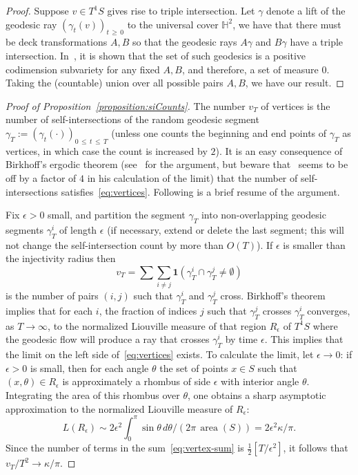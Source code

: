 \documentclass[10pt]{amsart}
\theoremstyle{definition}\newtheorem{defi}[theo]{Definition}\newtheorem{rema}[theo]{Remark}\newtheorem{exam}[theo]{Example}\newtheorem{exem}[theo]{Example}\newtheorem{nota}[theo]{Notation}
\DeclareMathOperator{\area}{area}
\begin{document}
\begin{proof}
Suppose $v \in T^1S$ gives rise to triple intersection. Let $\gamma$ denote a lift of the geodesic ray $(\gamma_{t} (v))_{t\,\geq\,0}$ to the universal cover $\mathbb H^2$, we have that there must be deck transformations $A, B$ so that the geodesic rays $A\gamma$ and $B\gamma$ have a triple intersection. In~\cite{Epstein}, it is shown that the set of such geodesics is a positive codimension subvariety for any fixed $A, B$, and therefore, a set of measure $0$. Taking the (countable) union over all possible pairs $A, B$, we have our result.
\end{proof}



\begin{proof}[Proof of Proposition~\ref{proposition:siCounts}]
The number $v_{T}$ of vertices is the number of self-intersections of the random geodesic segment $\gamma_{T}:= (\gamma_{t} (\cdot))_{0\,\leq\,t\,\leq\,T}$ (unless one counts the beginning and end points of $\gamma_{T}$ as vertices, in which case the count is increased by $2$). It is an easy consequence of Birkhoff's ergodic theorem (see~\cite[Section~2.3]{lalley:duke} for the argument, but beware that~\cite{lalley:duke} seems to be off by a factor of $4$ in his calculation of the limit) that the number of self-intersections satisfies~\eqref{eq:vertices}. Following is a brief resume of the argument.

Fix $\epsilon >0$ small, and partition the segment $\gamma_{T}$ into non-overlapping geodesic segments $\gamma^{i}_{T}$ of length $\epsilon$ (if necessary, extend or delete the last segment; this will not change the self-intersection count by more than $O (T)$). If $\epsilon$ is smaller than the injectivity radius then
\begin{equation}\label{eq:vertex-sum}
v_{T}=\sum \sum_{i\not =j} \mathbf{1} \left(\gamma^{i}_{T}\cap\gamma^{j}_{T}\not =\emptyset\right)
\end{equation}
is the number of pairs $(i,j)$ such that $\gamma^{i}_{T}$ and $\gamma^{j}_{T}$ cross. Birkhoff's theorem implies that for each $i$, the fraction of indices $j$ such that $\gamma^{j}_{T}$ crosses $\gamma^{i}_{T}$ converges, as $T \rightarrow \infty$, to the normalized Liouville measure of that region $R_{\epsilon}$ of $T^1S$ where the geodesic flow will produce a ray that crosses $\gamma^{i}_{T}$ by time $\epsilon$. This implies that the limit on the left side of~\eqref{eq:vertices} exists. To calculate the limit, let $\epsilon \rightarrow 0$: if $\epsilon >0$ is small, then for each angle $\theta$ the set of points $x\in S$ such that $(x,\theta)\in R_{\epsilon}$ is approximately a rhombus of side $\epsilon$ with interior angle $\theta$. Integrating the area of this rhombus over $\theta$, one obtains a sharp asymptotic approximation to the normalized Liouville measure of $R_{\epsilon}$:
\[
L (R_{\epsilon})\sim 2\epsilon^{2}\int_{0}^{\pi} \sin \theta
\,d\theta / (2\pi \,\area (S))=2\epsilon^{2} \kappa/\pi.
\]
Since the number of terms in the sum~\eqref{eq:vertex-sum} is $\frac{1}{2} [T/\epsilon^{2}]$, it follows that $v_{T}/T^{2}\rightarrow \kappa/\pi$.



\end{proof}
\end{document}
